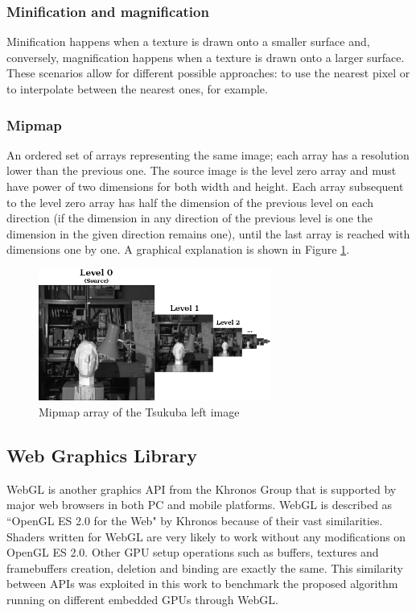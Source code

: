 \documentclass[conference]{IEEEtran}
\begin{document}
  \subsubsection{Minification and magnification}
Minification happens when a texture is drawn onto a smaller surface and, conversely, magnification happens when a texture is drawn onto a larger surface. These scenarios allow for different possible approaches: to use the nearest pixel or to interpolate between the nearest ones, for example. %

  \subsubsection{Mipmap}
An ordered set of arrays representing the same image; each array has a resolution lower than the previous one. The source image is the level zero array and must have power of two dimensions for both width and height. Each array subsequent to the level zero array has half the dimension of the previous level on each direction (if the dimension in any direction of the previous level is one the dimension in the given direction remains one), until the last array is reached with dimensions one by one. A graphical explanation is shown in Figure \ref{fig:mipmap_explanation}. %

\begin{figure}[!t]
 \centering
 \includegraphics[width=3.0in]{mipmap_explanation}
 \caption{Mipmap array of the Tsukuba left image}
 \label{fig:mipmap_explanation}
\end{figure}

 \subsection{Web Graphics Library}
WebGL is another graphics API from the Khronos Group that is supported by major web browsers in both PC and mobile platforms. WebGL is described as ``OpenGL ES 2.0 for the Web" by Khronos because of their vast similarities. Shaders written for WebGL are very likely to work without any modifications on OpenGL ES 2.0. Other GPU setup operations such as buffers, textures and framebuffers creation, deletion and binding are exactly the same. This similarity between APIs was exploited in this work to benchmark the proposed algorithm running on different embedded GPUs through WebGL. %
\end{document}
